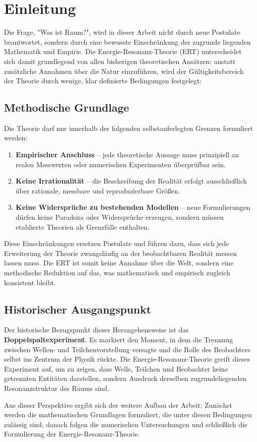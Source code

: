 \chapter{Einleitung}

Die Frage, "Was ist Raum?", wird in dieser Arbeit nicht durch neue Postulate beantwortet, sondern durch eine bewusste Einschränkung der zugrunde liegenden Mathematik und Empirie. 
Die Energie-Resonanz-Theorie (\acrshort{ERT}) unterscheidet sich damit grundlegend von allen bisherigen theoretischen Ansätzen: 
anstatt zusätzliche Annahmen über die Natur einzuführen, wird der Gültigkeitsbereich der Theorie durch wenige, klar definierte Bedingungen festgelegt:

\section{Methodische Grundlage}

Die Theorie darf nur innerhalb der folgenden selbstauferlegten Grenzen formuliert werden:

\begin{enumerate}
    \item \textbf{Empirischer Anschluss} – jede theoretische Aussage muss prinzipiell an realen Messwerten oder numerischen Experimenten überprüfbar sein.
    \item \textbf{Keine Irrationalität} – die Beschreibung der Realität erfolgt ausschließlich über rationale, messbare und reproduzierbare Größen.
    \item \textbf{Keine Widersprüche zu bestehenden Modellen} – neue Formulierungen dürfen keine Paradoxa oder Widersprüche erzeugen, sondern müssen etablierte Theorien als Grenzfälle enthalten.
\end{enumerate}

Diese Einschränkungen ersetzen Postulate und führen dazu, dass sich jede Erweiterung der Theorie zwangsläufig an der beobachtbaren Realität messen lassen muss. 
Die \acrshort{ERT} ist somit keine Annahme über die Welt, sondern eine methodische Reduktion auf das, was mathematisch und empirisch zugleich konsistent bleibt.

\section{Historischer Ausgangspunkt}

Der historische Bezugspunkt dieser Herangehensweise ist das \textbf{Doppelspaltexperiment}. 
Es markiert den Moment, in dem die Trennung zwischen Wellen- und Teilchenvorstellung versagte und die Rolle des Beobachters selbst ins Zentrum der Physik rückte. 
Die Energie-Resonanz-Theorie greift dieses Experiment auf, um zu zeigen, dass Welle, Teilchen und Beobachter keine getrennten Entitäten darstellen, 
sondern Ausdruck derselben zugrundeliegenden Resonanzstruktur des Raums sind.

Aus dieser Perspektive ergibt sich der weitere Aufbau der Arbeit:
Zunächst werden die mathematischen Grundlagen formuliert, die unter diesen Bedingungen zulässig sind,
danach folgen die numerischen Untersuchungen und schließlich die Formulierung der Energie-Resonanz-Theorie.
